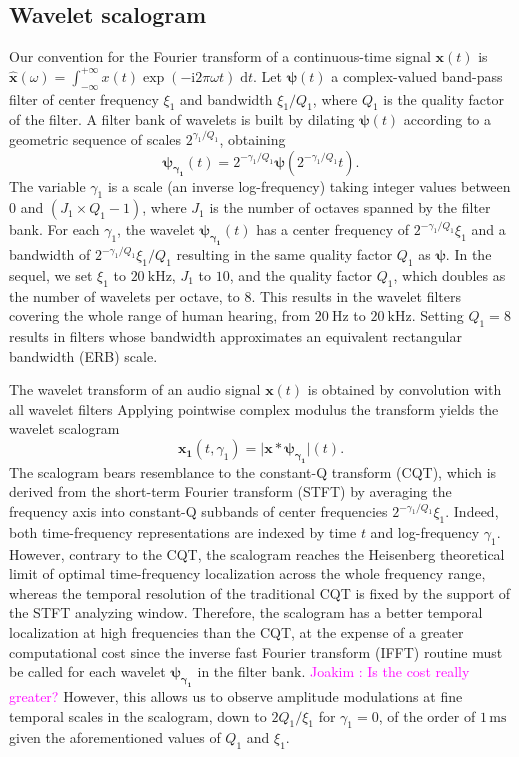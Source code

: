 \documentclass[journal]{IEEEtran}
\newcommand{\ja}[1]{\textcolor{magenta}{Joakim : #1}}
\begin{document}
\subsection{Wavelet scalogram}
Our convention for the Fourier transform of a continuous-time signal $\boldsymbol{x}(t)$ is $\boldsymbol{\hat{x}}(\omega) = \int_{-\infty}^{+\infty} x(t) \exp(- \mathrm{i} 2\pi \omega t) \; \mathrm{d}t$.
Let $\boldsymbol{\psi}(t)$ a complex-valued band-pass filter of
center frequency $\xi_1$ and bandwidth $\xi_1/Q_1$, where $Q_1$ is the quality factor of the filter.
A filter bank of wavelets is built by dilating $\boldsymbol{\psi}(t)$
according to a geometric sequence of scales $2^{\gamma_1/Q_1}$, obtaining
\begin{equation}
\boldsymbol{\psi_{\gamma_1}}(t) = 2^{-\gamma_1/Q_1} \boldsymbol{\psi}(2^{-\gamma_1/Q_1} t)\mbox{.}
\end{equation}
The variable $\gamma_1$ is a scale (an inverse log-frequency) taking integer values between $0$ and $(J_1 \times Q_1 - 1)$, where $J_1$ is the number of octaves spanned by the filter bank.
For each $\gamma_1$, the wavelet $\boldsymbol{\psi_{\gamma_1}}(t)$
has a center frequency of $2^{-\gamma_1/Q_1}\xi_1$ and a bandwidth of $2^{-\gamma_1/Q_1}\xi_1/Q_1$ resulting in the same quality factor $Q_1$ as $\boldsymbol{\psi}$.
In the sequel, we set $\xi_1$ to $20~\mathrm{kHz}$, $J_1$ to $10$, and the quality factor $Q_1$, which doubles as the number of wavelets per octave, to $8$. This results in the wavelet filters covering the whole range of human hearing, from $20~\mathrm{Hz}$ to $20~\mathrm{kHz}$. Setting $Q_1 = 8$ results in filters whose bandwidth approximates an equivalent rectangular bandwidth (ERB) scale.

The wavelet transform of an audio signal
$\boldsymbol{x}(t)$ is obtained by convolution with all wavelet filters
Applying pointwise complex modulus the transform yields
the wavelet scalogram
\begin{equation}
\boldsymbol{x_1}(t, \gamma_1)
= \vert \boldsymbol{x} \ast \boldsymbol{\psi_{\gamma_1}} \vert (t)\mbox{.}
\end{equation}
The scalogram bears resemblance to the constant-Q transform (CQT),
which is derived from the short-term Fourier transform (STFT) by averaging the frequency
axis into constant-Q subbands of center frequencies $2^{-\gamma_1/Q_1}\xi_1$.
Indeed, both time-frequency representations are indexed by time $t$ and log-frequency $\gamma_1$.
However, contrary to the CQT, the scalogram reaches the Heisenberg
theoretical limit of optimal time-frequency localization across the whole
frequency range, whereas the temporal resolution of the traditional CQT is fixed by the support of the STFT analyzing window. %
Therefore, the scalogram has a better temporal localization at high
frequencies than the CQT, at the expense of a greater computational cost
since the inverse fast Fourier transform (IFFT) routine must be called for each wavelet $\boldsymbol{\psi_{\gamma_1}}$ in the filter bank. \ja{Is the cost really greater?}
However, this allows us to observe amplitude modulations at fine temporal scales in the scalogram, down to $2Q_1/\xi_1$ for $\gamma_1 = 0$, of the order of $1\,\textrm{ms}$ given the aforementioned values of $Q_1$ and $\xi_1$.
\end{document}

